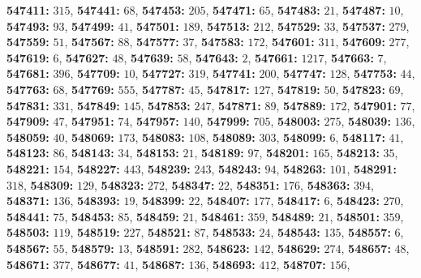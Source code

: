 \textsf{\bfseries 547411:} $315$, \textsf{\bfseries 547441:} $68$, \textsf{\bfseries 547453:} $205$, \textsf{\bfseries 547471:} $65$, \textsf{\bfseries 547483:} $21$, \textsf{\bfseries 547487:} $10$, \textsf{\bfseries 547493:} $93$, \textsf{\bfseries 547499:} $41$, \textsf{\bfseries 547501:} $189$, \textsf{\bfseries 547513:} $212$, \textsf{\bfseries 547529:} $33$, \textsf{\bfseries 547537:} $279$, \textsf{\bfseries 547559:} $51$, \textsf{\bfseries 547567:} $88$, \textsf{\bfseries 547577:} $37$, \textsf{\bfseries 547583:} $172$, \textsf{\bfseries 547601:} $311$, \textsf{\bfseries 547609:} $277$, \textsf{\bfseries 547619:} $6$, \textsf{\bfseries 547627:} $48$, \textsf{\bfseries 547639:} $58$, \textsf{\bfseries 547643:} $2$, \textsf{\bfseries 547661:} $1217$, \textsf{\bfseries 547663:} $7$, \textsf{\bfseries 547681:} $396$, \textsf{\bfseries 547709:} $10$, \textsf{\bfseries 547727:} $319$, \textsf{\bfseries 547741:} $200$, \textsf{\bfseries 547747:} $128$, \textsf{\bfseries 547753:} $44$, \textsf{\bfseries 547763:} $68$, \textsf{\bfseries 547769:} $555$, \textsf{\bfseries 547787:} $45$, \textsf{\bfseries 547817:} $127$, \textsf{\bfseries 547819:} $50$, \textsf{\bfseries 547823:} $69$, \textsf{\bfseries 547831:} $331$, \textsf{\bfseries 547849:} $145$, \textsf{\bfseries 547853:} $247$, \textsf{\bfseries 547871:} $89$, \textsf{\bfseries 547889:} $172$, \textsf{\bfseries 547901:} $77$, \textsf{\bfseries 547909:} $47$, \textsf{\bfseries 547951:} $74$, \textsf{\bfseries 547957:} $140$, \textsf{\bfseries 547999:} $705$, \textsf{\bfseries 548003:} $275$, \textsf{\bfseries 548039:} $136$, \textsf{\bfseries 548059:} $40$, \textsf{\bfseries 548069:} $173$, \textsf{\bfseries 548083:} $108$, \textsf{\bfseries 548089:} $303$, \textsf{\bfseries 548099:} $6$, \textsf{\bfseries 548117:} $41$, \textsf{\bfseries 548123:} $86$, \textsf{\bfseries 548143:} $34$, \textsf{\bfseries 548153:} $21$, \textsf{\bfseries 548189:} $97$, \textsf{\bfseries 548201:} $165$, \textsf{\bfseries 548213:} $35$, \textsf{\bfseries 548221:} $154$, \textsf{\bfseries 548227:} $443$, \textsf{\bfseries 548239:} $243$, \textsf{\bfseries 548243:} $94$, \textsf{\bfseries 548263:} $101$, \textsf{\bfseries 548291:} $318$, \textsf{\bfseries 548309:} $129$, \textsf{\bfseries 548323:} $272$, \textsf{\bfseries 548347:} $22$, \textsf{\bfseries 548351:} $176$, \textsf{\bfseries 548363:} $394$, \textsf{\bfseries 548371:} $136$, \textsf{\bfseries 548393:} $19$, \textsf{\bfseries 548399:} $22$, \textsf{\bfseries 548407:} $177$, \textsf{\bfseries 548417:} $6$, \textsf{\bfseries 548423:} $270$, \textsf{\bfseries 548441:} $75$, \textsf{\bfseries 548453:} $85$, \textsf{\bfseries 548459:} $21$, \textsf{\bfseries 548461:} $359$, \textsf{\bfseries 548489:} $21$, \textsf{\bfseries 548501:} $359$, \textsf{\bfseries 548503:} $119$, \textsf{\bfseries 548519:} $227$, \textsf{\bfseries 548521:} $87$, \textsf{\bfseries 548533:} $24$, \textsf{\bfseries 548543:} $135$, \textsf{\bfseries 548557:} $6$, \textsf{\bfseries 548567:} $55$, \textsf{\bfseries 548579:} $13$, \textsf{\bfseries 548591:} $282$, \textsf{\bfseries 548623:} $142$, \textsf{\bfseries 548629:} $274$, \textsf{\bfseries 548657:} $48$, \textsf{\bfseries 548671:} $377$, \textsf{\bfseries 548677:} $41$, \textsf{\bfseries 548687:} $136$, \textsf{\bfseries 548693:} $412$, \textsf{\bfseries 548707:} $156$, 
